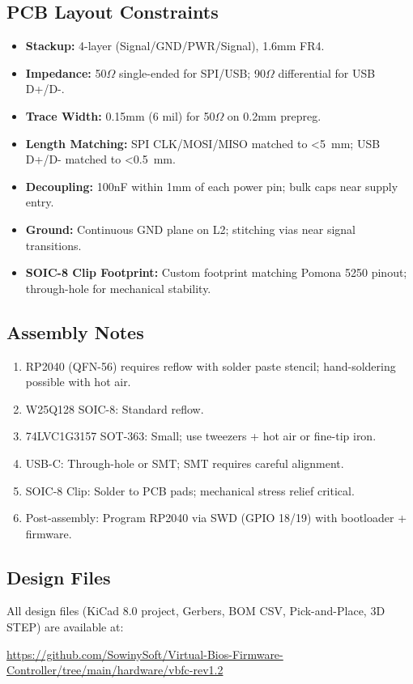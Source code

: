 \subsection{PCB Layout Constraints}
\begin{itemize}
    \item \textbf{Stackup:} 4-layer (Signal/GND/PWR/Signal), 1.6mm FR4.
    \item \textbf{Impedance:} 50$\Omega$ single-ended for SPI/USB; 90$\Omega$ differential for USB D+/D-.
    \item \textbf{Trace Width:} 0.15mm (6 mil) for 50$\Omega$ on 0.2mm prepreg.
    \item \textbf{Length Matching:} SPI CLK/MOSI/MISO matched to \SI{<5}{mm}; USB D+/D- matched to \SI{<0.5}{mm}.
    \item \textbf{Decoupling:} 100nF within 1mm of each power pin; bulk caps near supply entry.
    \item \textbf{Ground:} Continuous GND plane on L2; stitching vias near signal transitions.
    \item \textbf{SOIC-8 Clip Footprint:} Custom footprint matching Pomona 5250 pinout; through-hole for mechanical stability.
\end{itemize}

\subsection{Assembly Notes}
\begin{enumerate}
    \item RP2040 (QFN-56) requires reflow with solder paste stencil; hand-soldering possible with hot air.
    \item W25Q128 SOIC-8: Standard reflow.
    \item 74LVC1G3157 SOT-363: Small; use tweezers + hot air or fine-tip iron.
    \item USB-C: Through-hole or SMT; SMT requires careful alignment.
    \item SOIC-8 Clip: Solder to PCB pads; mechanical stress relief critical.
    \item Post-assembly: Program RP2040 via SWD (GPIO 18/19) with bootloader + firmware.
\end{enumerate}

\subsection{Design Files}
All design files (KiCad 8.0 project, Gerbers, BOM CSV, Pick-and-Place, 3D STEP) are available at:
\begin{center}
\url{https://github.com/SowinySoft/Virtual-Bios-Firmware-Controller/tree/main/hardware/vbfc-rev1.2}
\end{center}

